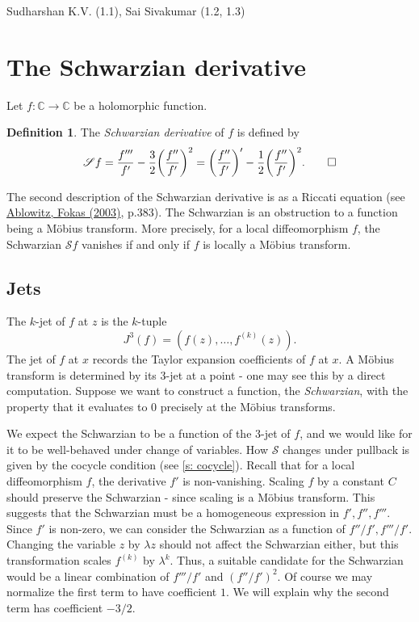 \documentclass[11pt,leqno]{article}
\theoremstyle{plain}
\theoremstyle{definition}
\newtheorem{definition/}[lem]{Definition}
\newenvironment{definition}
  {\renewcommand{\qedsymbol}{\textdagger}%
   \pushQED{\qed}\begin{definition/}}
  {\popQED\end{definition/}}
\numberwithin{equation}{section}
\numberwithin{lem}{section}
\begin{document}
Sudharshan K.V. (1.1), Sai Sivakumar (1.2, 1.3)

\section{The Schwarzian derivative}
Let $f: \mathbb C \to \mathbb C$ be a holomorphic function. 
\begin{definition}
    The \textit{Schwarzian derivative} of $f$ is defined by
    \[\mathscr Sf = \frac{f^{\prime\prime\prime}}{f^\prime}-\frac{3}{2}\biggl(\frac{f^{\prime\prime}}{f^\prime}\biggr)^2 = \biggl(\frac{f^{\prime\prime}}{f^\prime}\biggr)^\prime - \frac{1}{2}\biggl(\frac{f^{\prime\prime}}{f^\prime}\biggr)^2.\qedhere\]
\end{definition}
The second description of the Schwarzian derivative is as a Riccati equation (see \href{https://ftfsite.ru/wp-content/files/tfkp_endlish_2.2.pdf}{Ablowitz, Fokas (2003)}, p.383). The Schwarzian is an obstruction to a function being a M\"obius transform. More precisely, for a local diffeomorphism $f$, the Schwarzian $\mathscr Sf$ vanishes if and only if $f$ is locally a M\"obius transform.

\subsection{Jets}
The $k$-jet of $f$ at $z$ is the $k$-tuple $$J^3(f) = (f(z), \dots , f^{(k)}(z)).$$ The jet of $f$ at $x$ records the Taylor expansion coefficients of $f$ at $x$. A M\"obius transform is determined by its $3$-jet at a point - one may see this by a direct computation. Suppose we want to construct a function, the \textit{Schwarzian}, with the property that it evaluates to $0$ precisely at the M\"obius transforms.

We expect the Schwarzian to be a function of the $3$-jet of $f$, and we would like for it to be well-behaved under change of variables. How $\mathscr S$ changes under pullback is given by the cocycle condition (see \cref{s: cocycle}). Recall that for a local diffeomorphism $f$, the derivative $f'$ is non-vanishing. Scaling $f$ by a constant $C$ should preserve the Schwarzian - since scaling is a M\"obius transform. This suggests that the Schwarzian must be a homogeneous expression in $f',f'', f'''$. Since $f'$ is non-zero, we can consider the Schwarzian as a function of $f''/f', f'''/f'$. Changing the variable $z$ by $\lambda z$ should not affect the Schwarzian either, but this transformation scales $f^{(k)}$ by $\lambda^k$. Thus, a suitable candidate for the Schwarzian would be a linear combination of $f'''/f'$ and $(f''/f')^2$. Of course we may normalize the first term to have coefficient $1$. We will explain why the second term has coefficient $-3/2$.
\end{document}
